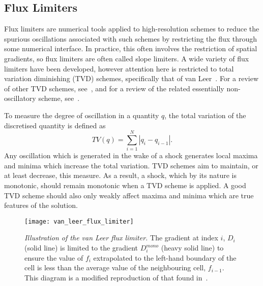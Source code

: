 \subsection{Flux Limiters}
\label{sec-flux-limiters}

Flux limiters are numerical tools applied to high-resolution schemes to reduce the spurious oscillations associated with such schemes by restricting the flux through some numerical interface. In practice, this often involves the restriction of spatial gradients, so flux limiters are often called slope limiters. A wide variety of flux limiters have been developed, however attention here is restricted to total variation diminishing (TVD) schemes, specifically that of van Leer~\cite{vanleerUltimateConservativeDifference1997}. For a review of other TVD schemes, see~\cite{zhangReviewTVDSchemes2015}, and for a review of the related essentially non-oscillatory scheme, see~\cite{shuHighOrderENO1999a}. 

To measure the degree of oscillation in a quantity $q$, the total variation of the discretised quantity is defined as
\begin{equation}
  \label{eq:total_variation}
TV(q) = \sum_{i=1}^{N} | q_i - q_{i-1} |.
\end{equation}
Any oscillation which is generated in the wake of a shock generates local maxima and minima which increase the total variation. TVD schemes aim to maintain, or at least decrease, this measure. As a result, a shock, which by its nature is monotonic, should remain monotonic when a TVD scheme is applied. A good TVD scheme should also only weakly affect maxima and minima which are true features of the solution.

\begin{figure}[t]
  \centering
  \texttt{[image: van\_leer\_flux\_limiter]}
  \caption{\emph{Illustration of the van Leer flux limiter.} The gradient at index $i$, $D_i$ (solid line) is limited to the gradient $D_i^{mono}$ (heavy solid line) to ensure the value of $f_i$ extrapolated to the left-hand boundary of the cell is less than the average value of the neighbouring cell, $f_{i-1}$. This diagram is a modified reproduction of that found in~\cite{vanleerUltimateConservativeDifference1997}.}%
  \label{fig:van_leer_flux_limiter}
\end{figure}

